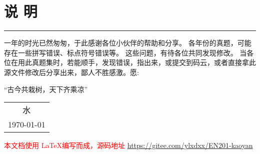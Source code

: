 




\chapter*{说 \quad 明}
\thispagestyle{empty}




\rule{2em}{0pt}一年的时光已然匆匆，于此感谢各位小伙伴的帮助和分享。
各年份的真题，可能存在一些拼写错误、标点符号错误等。
这些问题，有待各位共同发现修改。
当各位在用此真题集时，若能顺手，发现错误，指出来，或提交到码云，或者直接拿此源文件修改后分享出来，鄙人不胜感激。愿:
\begin{center}
	\kaishu 
	“古今共栽树，天下齐乘凉”
\end{center}
\begin{center}
	\flushright
	\begin{tabular}{c}
		水   \\
		\today
	\end{tabular}	
\end{center}

\vfil
\noindent
\textcolor{red}{本文档使用 \LaTeX 编写而成，源码地址 \url{https://gitee.com/ylxdxx/EN201-kaoyan}  }
\vfil

\pagestyle{fancy}

